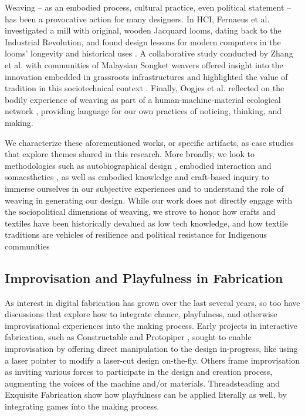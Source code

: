 Weaving – as an embodied process, cultural practice, even political statement – has been a provocative action for many designers. In HCI, Fernaeus et al. investigated a mill with original, wooden Jacquard looms, dating back to the Industrial Revolution, and found design lessons for modern computers in the looms’ longevity and historical uses \cite{fernaeus_revisiting_2012}. A collaborative study conducted by Zhang et al. with communities of Malaysian Songket weavers offered insight into the innovation embedded in grassroots infrastructures and highlighted the value of tradition in this sociotechnical context \cite{zhang_designing_2019}. Finally, Oogjes et al. reflected on the bodily experience of weaving as part of a human-machine-material ecological network \cite{oogjes_weaving_2022}, providing language for our own practices of noticing, thinking, and making. 

We characterize these aforementioned works, or specific artifacts, as case studies that explore themes shared in this research. More broadly, we look to methodologies such as autobiographical design \cite{neustaedter_autobiographical_2012, desjardins_revealing_2018}, embodied interaction and somaesthetics \cite{hook_unpacking_2021, baurley_modalities_2020, vaughan_embodying_2006}, as well as embodied knowledge and craft-based inquiry \cite{flanagan_tracing_2019, frankjaer_understanding_2018, schoemann_needle_2017} to immerse ourselves in our subjective experiences and to understand the role of weaving in generating our design. While our work does not directly engage with the sociopolitical dimensions of weaving, we strove to honor how crafts and textiles have been historically devalued as low tech knowledge, and how textile traditions are vehicles of resilience and political resistance for Indigenous communities \cite{flores_weaving_2021, montero_spinning_2021}

\subsection{Improvisation and Playfulness in Fabrication}

As interest in digital fabrication has grown over the last several years, so too have discussions that explore how to integrate chance, playfulness, and otherwise improvisational experiences into the making process. Early projects in interactive fabrication, such as Constructable \cite{mueller_constructable_2013} and Protopiper \cite{agrawal_protopiper_2015}, sought to enable improvisation by offering direct manipulation to the design in-progress, like using a laser pointer to modify a laser-cut design on-the-fly. Others frame improvisation as inviting various forces to participate in the design and creation process, augmenting the voices of the machine and/or materials. Threadsteading \cite{albaugh_threadsteading_2016} and Exquisite Fabrication \cite{goveia_da_rocha_exquisite_2021} show how playfulness can be applied literally as well, by integrating games into the making process. 

